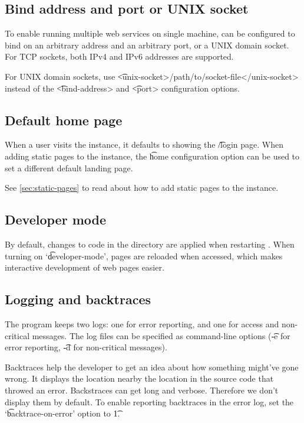 \subsection{Bind address and port or UNIX socket}

  To enable running multiple web services on single machine, 
  can be configured to bind on an arbitrary address and an arbitrary port, or
  a UNIX domain socket.  For TCP sockets, both IPv4 and IPv6 addresses are
  supported.

  For UNIX domain sockets, use
  \t{<unix-socket>/path/to/socket-file</unix-socket>} instead of the
  \t{<bind-address>} and \t{<port>} configuration options.

\subsection{Default home page}

  When a user visits the  instance, it defaults to showing
  the \t{/login} page.  When adding static pages to the 
  instance, the \t{home} configuration option can be used to set a different
  default landing page.

  See \ref{sec:static-pages} to read about how to add static pages to the
   instance.

\subsection{Developer mode}

  By default, changes to code in the  directory are
  applied when restarting .  When turning on
  `\t{developer-mode}', pages are reloaded when accessed, which makes
  interactive development of web pages easier.

\subsection{Logging and backtraces}
\label{sec:logging}

  The  program keeps two logs: one for error reporting, and
  one for access and non-critical messages.  The log files can be specified
  as command-line options (\t{-e} for error reporting, \t{-d} for
  non-critical messages).

  Backtraces help the developer to get an idea about how something might've
  gone wrong.  It displays the location nearby the location in the source code
  that throwed an error.  Backstraces can get long and verbose.  Therefore we
  don't display them by default.  To enable reporting backtraces in the error
  log, set the `\t{backtrace-on-error}' option to \t{1}.

